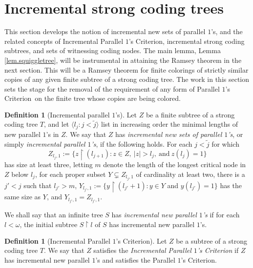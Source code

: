 \documentclass{amsart}
\theoremstyle{remark}
\theoremstyle{definition}
\newtheorem{defn}[thm]{Definition}
\theoremstyle{remark}
\newcommand{\om}{\omega}
\newcommand{\re}{\restriction}
\newcommand{\lgl}{\langle}
\newcommand{\rgl}{\rangle}
\newcommand{\POC}{Parallel $1$'s Criterion}
\newcommand{\IPOC}{Incremental Parallel $1$'s Criterion}
\begin{document}

\section{Incremental strong coding trees}\label{sec.squiggle}






This section develops the notion of incremental new sets of parallel $1$'s,
and the related concepts of
\IPOC,
incremental
 strong coding subtrees, and  sets of witnessing coding nodes.
The main lemma, Lemma \ref{lem.squiggletree},
will be instrumental in attaining
the Ramsey theorem in the next section.
This will be a Ramsey theorem for finite  colorings of
strictly similar copies of any given
 finite subtree of a strong coding tree.
The work in this section sets the stage  for the  removal of the requirement of
 any form of \POC\ on the finite tree whose copies are being colored.




\begin{defn}[Incremental  parallel $1$'s]\label{defn.incrementalpo}
Let $Z$ be a  finite
 subtree of a strong coding tree $T$,
 and let $\lgl l_j:j<\tilde{j}\rgl$
list in increasing order the minimal lengths
of new  parallel $1$'s in $Z$.
We say that
$Z$ has {\em incremental  new sets of  parallel $1$'s},
or simply
{\em incremental parallel $1$'s},
 if
the following holds.
For each $j<\tilde{j}$ for which
\begin{equation}
Z_{l_j,1}:=\{z\re (l_{j+1}):z\in Z, \ |z|>l_j,\mathrm{\  and \ } z(l_j)=1\}
\end{equation}
has size at least three,
letting $m$  denote the length of the longest critical node in $Z$ below $l_j$,
for each
proper subset $Y\subsetneq Z_{l_j,1}$  of cardinality at least two,
there is a $j'<j$ such that  $l_{j'}>m$,
$Y_{l_{j'},1}:=\{y\re(l_{j'}+1):y\in Y$ and $y(l_{j'})=1\}$ has the same size as $Y$,
and
$Y_{l_{j'},1}=Z_{l_{j'},1}$.



We shall say that an infinite  tree $S$ has {\em incremental new parallel $1$'s} if for  each
$l<\om$, the
initial subtree $S\re l$ of $S$
 has incremental new parallel $1$'s.
\end{defn}



\begin{defn}[\IPOC]\label{defn.IPOC}
Let $Z$ be a
 subtree of a strong coding tree $T$.
We say that $Z$ satisfies the {\em \IPOC} if
$Z$ has incremental new parallel $1$'s and  satisfies the \POC.
\end{defn}
\end{document}

